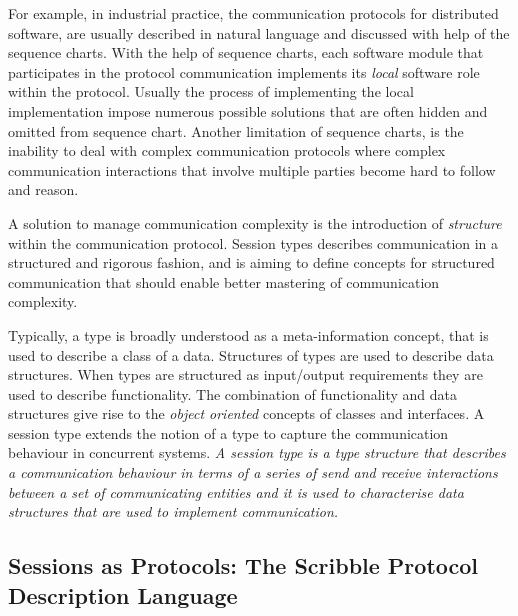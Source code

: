 For example, in industrial practice, the communication protocols for
distributed software, are usually described in natural language and
discussed with help of the sequence charts.
With the help of sequence charts,
each software module that participates in the
protocol communication implements
its \emph{local} software role within the protocol.
Usually the process of implementing the local implementation
impose numerous possible solutions that are often hidden and
omitted from sequence chart.
Another limitation of sequence charts, is the inability to deal with complex
communication protocols where complex communication interactions
that involve multiple parties become hard to follow and reason.

A solution to manage communication complexity
is the introduction of \emph{structure} within the communication protocol.
Session types describes communication in a structured and rigorous fashion,
and is aiming to define concepts for structured communication
that should enable better mastering of communication complexity.


Typically, a type is broadly understood
as a meta-information concept, that is used to describe a class of a data.
Structures of types are used to describe data structures.
When types are structured as input/output requirements they
are used to describe functionality.
The combination of functionality and data structures give rise
to the \emph{object oriented} concepts of classes and interfaces.%
%
A session type extends %
the notion of a type to capture the communication behaviour in concurrent systems.
{\em A session type is a type structure that describes a communication
	behaviour in terms of a series of send and receive %
	interactions between a set of communicating entities and it is used
	to characterise data structures that are used to implement communication.}

\subsection{Sessions as Protocols: The Scribble Protocol Description Language}
\label{sec:sessions_scribble}

